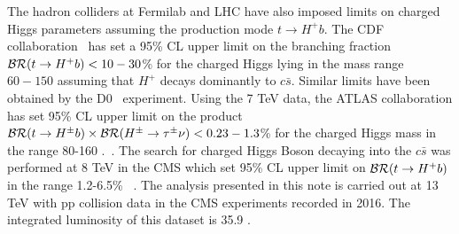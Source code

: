 The hadron colliders at Fermilab and LHC have also imposed limits on charged Higgs parameters assuming
the production mode $t\rightarrow H^+b$. The CDF collaboration~\cite{Aaltonen:2009ke} has set 
a 95\% CL upper limit on the branching fraction ${\cal{BR}}(t\rightarrow H^+b) <10 -30$\% for the charged 
Higgs lying in the mass range $60-150$ \GeV assuming that $H^+$ decays dominantly to $c\bar s$. 
Similar limits have been obtained by the D0~\cite{Abazov:2009aa} experiment. Using the 7 TeV data,
the ATLAS collaboration has set 95\% CL upper limit on the product ${\cal{BR}}(t\rightarrow H^\pm b)\times 
{\cal{BR}}(H^\pm \rightarrow \tau^\pm\nu)< 0.23-1.3$\% for the charged Higgs mass in the range 80-160
\GeV.~\cite{Aad:2013hla}. The search for charged Higgs Boson decaying into the $c\bar{s}$ was 
performed at 8 TeV in the CMS which set 95\% CL upper limit on 
${\cal{BR}}(t\rightarrow H^+ b)$ in the range 1.2-6.5\% ~\citep{Khachatryan:2015uua}. 
The analysis presented in this note is carried out at 13 TeV with pp collision data in the CMS 
experiments recorded in 2016. The integrated luminosity of this dataset is 35.9 \fbinv.
 
